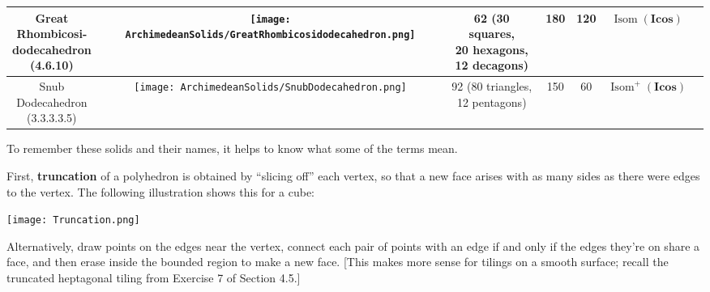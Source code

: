 \documentclass[leqno]{book}
\begin{document}
\begin{center}
\begin{tabular}{ccccccc}
\parbox{2.5cm}{Great\\Rhombicosi-\\dodecahedron\\(4.6.10)}&
\texttt{[image: ArchimedeanSolids/GreatRhombicosidodecahedron.png]}&
62 \parbox{2cm}{(30 squares,\\20 hexagons,\\12 decagons)}&
180&
120&
$\operatorname{Isom}(\mathbf{Icos})$\\\hline

\parbox{2.5cm}{Snub\\Dodecahedron\\(3.3.3.3.5)}&
\texttt{[image: ArchimedeanSolids/SnubDodecahedron.png]}&
92 \parbox{2.2cm}{(80 triangles,\\12 pentagons)}&
150&
60&
$\operatorname{Isom}^+(\mathbf{Icos})$\\\hline
\end{tabular}
\end{center}

To remember these solids and their names, it helps to know what some of the terms mean.

First, \textbf{truncation} of a polyhedron is obtained by ``slicing off'' each vertex, so that a new face arises with as many sides as there were edges to the vertex.  The following illustration shows this for a cube:
\begin{center}
\texttt{[image: Truncation.png]}
\end{center}
Alternatively, draw points on the edges near the vertex, connect each pair of points with an edge if and only if the edges they're on share a face, and then erase inside the bounded region to make a new face.  [This makes more sense for tilings on a smooth surface; recall the truncated heptagonal tiling from Exercise 7 of Section 4.5.]
\end{document}
